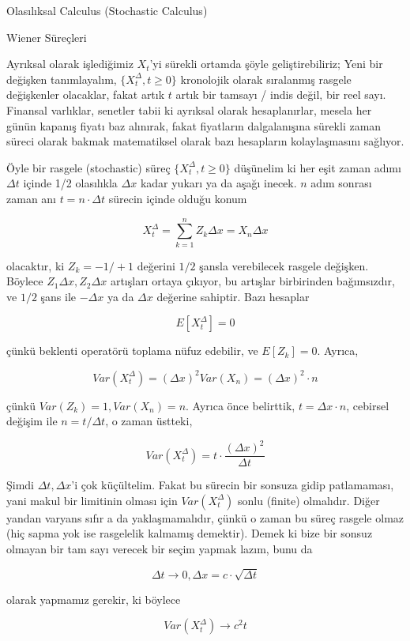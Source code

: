\documentclass[12pt,fleqn]{article}\usepackage{../../common}
\begin{document}
Olasılıksal Calculus (Stochastic Calculus)

Wiener Süreçleri 

Ayrıksal olarak işlediğimiz $X_t$'yi sürekli ortamda şöyle geliştirebiliriz;
Yeni bir değişken tanımlayalım, $\{ X_t^{\Delta}, t \ge 0 \}$ kronolojik olarak
sıralanmış rasgele değişkenler olacaklar, fakat artık $t$ artık bir tamsayı /
indis değil, bir reel sayı. Finansal varlıklar, senetler tabii ki ayrıksal
olarak hesaplanırlar, mesela her günün kapanış fiyatı baz alınırak, fakat
fiyatların dalgalanışına sürekli zaman süreci olarak bakmak matematiksel olarak
bazı hesapların kolaylaşmasını sağlıyor.

Öyle bir rasgele (stochastic) süreç $\{ X_t^{\Delta}, t \ge 0 \}$ düşünelim ki
her eşit zaman adımı $\Delta t$ içinde 1/2 olasılıkla $\Delta x$ kadar yukarı ya
da aşağı inecek. $n$ adım sonrası zaman anı $t = n \cdot \Delta t$ sürecin
içinde olduğu konum

$$ X_t^{\Delta} = \sum_{k=1}^{n} Z_k \Delta x = X_n \Delta x $$

olacaktır, ki $Z_k = -1/+1$ değerini $1/2$ şansla verebilecek rasgele
değişken. Böylece $Z_1 \Delta x,Z_2 \Delta x$ artışları ortaya çıkıyor, bu
artışlar birbirinden bağımsızdır, ve $1/2$ şans ile $-\Delta x$ ya da $\Delta x$
değerine sahiptir. Bazı hesaplar

$$ E[X_t^{\Delta}] = 0 $$

çünkü beklenti operatörü toplama nüfuz edebilir, ve $E[Z_k] = 0$. Ayrıca,

$$ Var(X_t^{\Delta}) = (\Delta x)^2 Var(X_n) =  (\Delta x)^2 \cdot n$$

çünkü $Var(Z_k) = 1,Var(X_n)=n$. Ayrıca önce belirttik, $t = \Delta x \cdot n$,
cebirsel değişim ile $n = t / \Delta t$, o zaman üstteki,

$$ Var(X_t^{\Delta}) = t \cdot \frac{(\Delta x)^2}{\Delta t}  $$

Şimdi $\Delta t,\Delta x$'i çok küçültelim. Fakat bu sürecin bir sonsuza gidip
patlamaması, yani makul bir limitinin olması için $Var(X_t^{\Delta})$ sonlu
(finite) olmalıdır. Diğer yandan varyans sıfır a da yaklaşmamalıdır, çünkü o
zaman bu süreç rasgele olmaz (hiç sapma yok ise rasgelelik kalmamış
demektir). Demek ki bize bir sonsuz olmayan bir tam sayı verecek bir seçim
yapmak lazım, bunu da

$$\Delta t \to 0, \Delta x = c \cdot \sqrt{\Delta t}$$

olarak yapmamız gerekir, ki böylece 

$$Var(X_t^{\Delta}) \to c^2t$$ 
\end{document}
